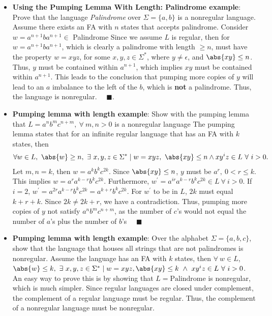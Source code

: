 \documentclass{report}
\begin{document}
\begin{itemize}
\item \textbf{Using the Pumping Lemma With Length: Palindrome example}: Prove that the language \textit{Palindrome} over $\Sigma = \{a,b\} $ is a nonregular language.
    \bigbreak \noindent 
    Assume there exists an FA with $n$ states that accepts palindrome. Consider $w = a^{n+1}ba^{n+1} \in $ Palindrome
    \bigbreak \noindent 
    Since we assume $L$ is regular, then for $w=a^{n+1}ba^{n+1}$, which is clearly a palindrome with length $\geq n$, must have the property $w=xyz$, for some $x,y,z  \in \Sigma^{*}$, where $y\ne \epsilon$, and $\abs{xy} \leq n$. Thus, $y$ must be contained within $a^{n+1}$, which implies $xy$ must be contained within $a^{n+1}$. This leads to the conclusion that pumping more copies of $y$ will lead to an $a$ imbalance to the left of the $b$, which is \textbf{not} a palindrome. Thus, the language is nonregular. $\quad \blacksquare$.
\item \textbf{Pumping lemma with length example}: 
    Show with the pumping lemma that $L = a^{n}b^{m}c^{n+m},\ \forall\ m,n > 0$ is a nonregular language
    \bigbreak \noindent 
    The pumping lemma states that for an infinite regular language that has an FA with $k$ states, then
    \begin{align*}
        \forall w \in L,\ \abs{w} \ge n,\ \exists\ x,y,z\in \Sigma^{*} \mid w =xyz,\ \abs{xy} \le n \land xy^{i}z \in L \ \forall\ i > 0
    .\end{align*}
    Let $m,n = k$, then $w = a^{k}b^{k}c^{2k}$. Since $\abs{xy} \le n$, $y$ must be $a^{r},\ 0 < r \le k$. This implies $w = a^{r}a^{k-r}b^{k}c^{2k}$. Furthermore, $w^{\prime} = a^{ir}a^{k-r}b^{k}c^{2k} \in L\ \forall\ i > 0$. If $i = 2$, $w^{\prime} = a^{2r}a^{k-r}b^{k}c^{2k} = a^{k+r}b^{k}c^{2k}$. For $w^{\prime}$ to be in $L$, $2k$ must equal $k+r + k$. Since $2k \ne 2k + r$, we have a contradiction. Thus, pumping more copies of $y$ not satisfy $a^{n}b^{m} c^{n+m}$, as the number of $c$'s would not equal the number of $a$'s plus the number of $b$'s $\quad \blacksquare$
\item \textbf{Pumping lemma with length example}: 
    Over the alphabet $\Sigma = \{a,b,c\}$, show that the language that houses all strings that are not palindromes is nonregular.
    \bigbreak \noindent 
    Assume the language has an FA with $k$ states, then $\forall\ w \in L$, $\abs{w} \leq k,\ \exists \ x,y,z\in \Sigma^{*} \mid w = xyz, \abs{xy} \le k \ \land \ xy^{i}z \in L \ \forall \ i>0$.
    \bigbreak \noindent 
    An easy way to prove this is by showing that $L = \text{Palindrome}$ is nonregular, which is much simpler. Since regular languages are closed under complement, the complement of a regular language must be regular. Thus, the complement of a nonregular language must be nonregular.

\end{itemize}
\end{document}
